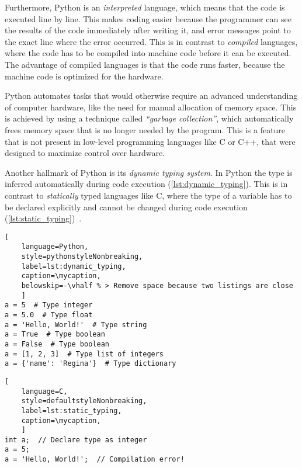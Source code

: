 Furthermore, Python is an \textit{interpreted} language, which means that the
code is executed line by line. This makes coding easier because the programmer
can see the results of the code immediately after writing it, and error messages
point to the exact line where the error occurred. This is in contrast to
\textit{compiled} languages, where the code has to be compiled into machine code
before it can be executed. The advantage of compiled languages is that the code
runs faster, because the machine code is optimized for the hardware.

Python automates tasks that would otherwise require an advanced understanding of
computer hardware, like the need for manual allocation of memory space. This is
achieved by using a technique called \textit{``garbage collection''}, which
automatically frees memory space that is no longer needed by the program. This
is a feature that is not present in low-level programming languages like C or
C++, that were designed to maximize control over hardware.

Another hallmark of Python is its \textit{dynamic typing system}. In Python the
type  is inferred automatically during code execution
(\autoref{lst:dynamic_typing}). This is in contrast to \textit{statically} typed
languages like C, where the type of a variable has to be declared explicitly and
cannot be changed during code execution
(\autoref{lst:static_typing})~\cite{PythonLanguageReference2024}.

\def\mycaption{ Example of dynamic typing in Python. The variable ``\texttt{a}''
    is assigned the value 5, which is of type integer. The variable ``\texttt{a}''
    is then assigned the value ``\texttt{Hello, World!}'', which is of type string.
    Python allows dynamic re-assignment of variables with different types. Note that
    code after ``\texttt{\#}'' is considered a comment and won't be executed.}
\begin{lstlisting}[
    language=Python,
    style=pythonstyleNonbreaking,
    label=lst:dynamic_typing,
    caption=\mycaption,
    belowskip=-\vhalf % > Remove space because two listings are close
    ]
a = 5  # Type integer
a = 5.0  # Type float
a = 'Hello, World!'  # Type string
a = True  # Type boolean
a = False  # Type boolean
a = [1, 2, 3]  # Type list of integers
a = {'name': 'Regina'}  # Type dictionary
\end{lstlisting}

\def\mycaption{ Example of static typing in C. The variable ``\texttt{a}'' is
    declared as an integer (\texttt{int}), and can only store integers. The
    variable ``\texttt{a}'' is then assigned the value 5, which is an integer.
    The variable ``\texttt{a}'' is then assigned the value \texttt{'Hello,
        World!'}, which is a string. This results in a compilation error, because
    the variable ``\texttt{a}'' can only store integers. Note that code after
    ``\texttt{//}'' is considered a comment and won't be executed. }
\begin{lstlisting}[
    language=C,
    style=defaultstyleNonbreaking,
    label=lst:static_typing,
    caption=\mycaption,
    ]
int a;  // Declare type as integer
a = 5;
a = 'Hello, World!';  // Compilation error!
\end{lstlisting}

